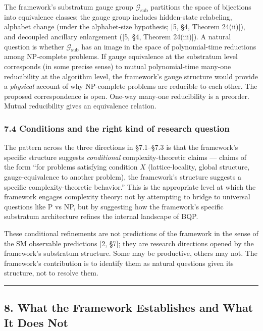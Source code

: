 \documentclass[
]{article}
\begin{document}
The framework's substratum gauge group \(\mathcal{G}_{\text{sub}}\)
partitions the space of bijections into equivalence classes; the gauge
group includes hidden-state relabeling, alphabet change (under the
alphabet-size hypothesis; {[}5, §4, Theorem 24(ii){]}), and decoupled
ancillary enlargement ({[}5, §4, Theorem 24(iii){]}). A natural question
is whether \(\mathcal{G}_{\text{sub}}\) has an image in the space of
polynomial-time reductions among NP-complete problems. If gauge
equivalence at the substratum level corresponds (in some precise sense)
to mutual polynomial-time many-one reducibility at the algorithm level,
the framework's gauge structure would provide a \emph{physical} account
of why NP-complete problems are reducible to each other. The proposed
correspondence is open. One-way many-one reducibility is a preorder.
Mutual reducibility gives an equivalence relation.

\hypertarget{conditions-and-the-right-kind-of-research-question}{%
\subsubsection{7.4 Conditions and the right kind of research
question}\label{conditions-and-the-right-kind-of-research-question}}

The pattern across the three directions in §7.1--§7.3 is that the
framework's specific structure suggests \emph{conditional}
complexity-theoretic claims --- claims of the form ``for problems
satisfying condition \(X\) (lattice-locality, global structure,
gauge-equivalence to another problem), the framework's structure
suggests a specific complexity-theoretic behavior.'' This is the
appropriate level at which the framework engages complexity theory: not
by attempting to bridge to universal questions like P vs NP, but by
suggesting how the framework's specific substratum architecture refines
the internal landscape of BQP.

These conditional refinements are not predictions of the framework in
the sense of the SM observable predictions {[}2, §7{]}; they are
research directions opened by the framework's substratum structure. Some
may be productive, others may not. The framework's contribution is to
identify them as natural questions given its structure, not to resolve
them.

\begin{center}\rule{0.5\linewidth}{0.5pt}\end{center}

\hypertarget{what-the-framework-establishes-and-what-it-does-not}{%
\subsection{8. What the Framework Establishes and What It Does
Not}\label{what-the-framework-establishes-and-what-it-does-not}}
\end{document}
